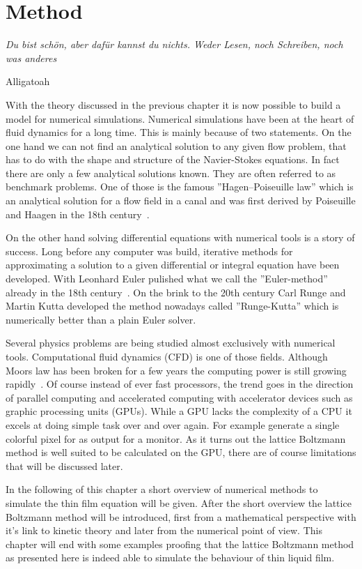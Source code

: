 \chapter{Method}
\label{chapter:method}
\epigraph{\textit{Du bist schön, aber dafür kannst du nichts.
Weder Lesen, noch Schreiben, noch was anderes}}{Alligatoah}
With the theory discussed in the previous chapter it is now possible to build a model for numerical simulations.
Numerical simulations have been at the heart of fluid dynamics for a long time.
This is mainly because of two statements.
On the one hand we can not find an analytical solution to any given flow problem, that has to do with the shape and structure of the Navier-Stokes equations.
In fact there are only a few analytical solutions known. 
They are often referred to as benchmark problems.
One of those is the famous ''Hagen–Poiseuille law'' which is an analytical solution for a flow field in a canal and was first derived by Poiseuille and Haagen in the 18th century~\cite{sutera1993history}.

On the other hand solving differential equations with numerical tools is a story of success.
Long before any computer was build, iterative methods for approximating a solution to a given differential or integral equation have been developed.
With Leonhard Euler pulished what we call the ''Euler-method'' already in the 18th century~\cite{brezinski2012numerical}.
On the brink to the 20th century Carl Runge and Martin Kutta developed the method nowadays called ''Runge-Kutta'' which is numerically better than a plain Euler solver.

Several physics problems are being studied almost exclusively with numerical tools.
Computational fluid dynamics (CFD) is one of those fields.
Although Moors law has been broken for a few years the computing power is still growing rapidly~\cite{591665}.
Of course instead of ever fast processors, the trend goes in the direction of parallel computing and accelerated computing with accelerator devices such as graphic processing units (GPUs).
While a GPU lacks the complexity of a CPU it excels at doing simple task over and over again.
For example generate a single colorful pixel for as output for a monitor.
As it turns out the lattice Boltzmann method is well suited to be calculated on the GPU, there are of course limitations that will be discussed later.

In the following of this chapter a short overview of numerical methods to simulate the thin film equation will be given.
After the short overview the lattice Boltzmann method will be introduced, first from a mathematical perspective with it's link to kinetic theory and later from the numerical point of view.
This chapter will end with some examples proofing that the lattice Boltzmann method as presented here is indeed able to simulate the behaviour of thin liquid film.

